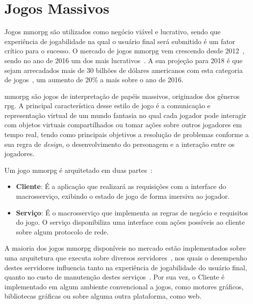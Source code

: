 \section{Jogos Massivos}
\label{sec:mmorpg}



Jogos \ac{mmorpg} são utilizados como negócio viável e lucrativo, sendo que experiência de jogabilidade na qual o usuário final será submitido é um fator crítico para o sucesso.
%
O mercado de jogos \ac{mmorpg} vem crescendo desde 2012~\cite{new_york_times}, sendo no ano de 2016 um dos mais lucrativos~\cite{statista_2016}.
%
A sua projeção para 2018 é que sejam arrecadados mais de 30 bilhões de dólares americanos com esta categoria de jogos~\cite{statista_2018}, um aumento de 20\% a mais sobre o ano de 2016.



\ac{mmorpg} são jogos de interpretação de papéis massivos, originados dos gêneros \ac{rpg}.
%
A principal característica desse estilo de jogo é a comunicação e representação virtual de um mundo fantasia no qual cada jogador pode interagir com objetos virtuais compartilhados ou tomar ações sobre outros jogadores em tempo real, tendo como principais objetivos a resolução de problemas conforme a sua regra de \textit{design}, o desenvolvimento do personagem e a interação entre os jogadores\cite{video_game_technologies}.


Um jogo \ac{mmorpg} é arquitetado em duas partes~\cite{mmo_analytic}:
\begin{itemize}
  \item \textbf{Cliente}: É a aplicação que realizará as requisições com a interface do macrosserviço, exibindo o estado de jogo de forma imersiva ao jogador.
  \item \textbf{Serviço}: É o macrosserviço que implementa as regras de negócio e requisitos do jogo.
  O serviço disponibiliza uma interface com ações possíveis ao cliente sobre algum protocolo de rede.
\end{itemize}



A maioria dos jogos \ac{mmorpg} disponíveis no mercado estão implementados sobre uma arquitetura que executa sobre diversos servidores~\cite{stephenclarkewillson2017}, nos quais o desempenho destes servidores influencia tanto na experiência de jogabilidade do usuário final, quanto no custo de manutenção destes serviços~\cite{1417630}.
%
Por sua vez, o Cliente é implementado em algum ambiente convencional a jogos, como motores gráficos, bibliotecas gráficas ou sobre alguma outra plataforma, como web.


